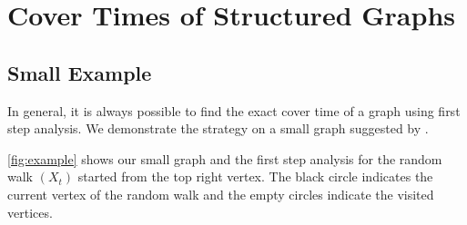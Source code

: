 \documentclass[12pt]{article}
\theoremstyle{definition}
\begin{document}
\section{Cover Times of Structured Graphs}\label{sec:structured_graphs}

\subsection{Small Example}\label{sec:small_example}
In general, it is always possible to find the exact cover time
of a graph using first step analysis.
We demonstrate the strategy on a small graph suggested by \cite{BH94}.

\cref{fig:example} shows our small graph and the first step analysis
for the random walk $(X_t)$ started from the top right vertex.
The black circle indicates the current vertex of the random walk
and the empty circles indicate the visited vertices.
\end{document}
